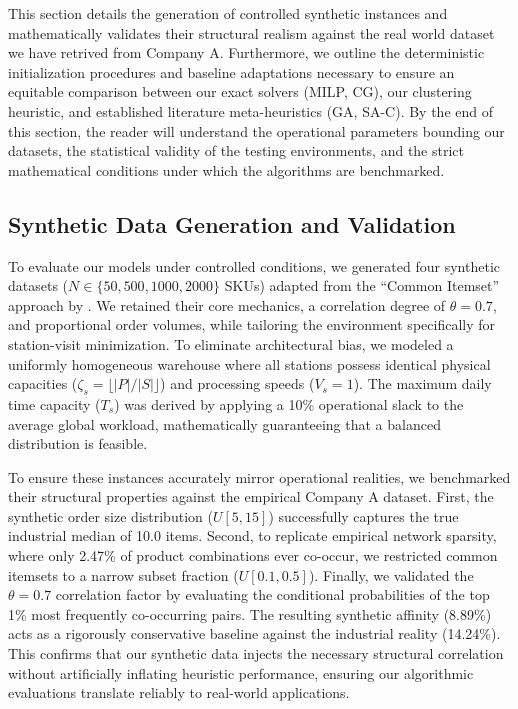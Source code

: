 \documentclass[preprint,review,11pt,authoryear]{elsarticle}
\begin{document}
This section details the generation of controlled synthetic instances and mathematically validates their structural realism against the real world dataset we have retrived from Company A. Furthermore, we outline the deterministic initialization procedures and baseline adaptations necessary to ensure an equitable comparison between our exact solvers (MILP, CG), our clustering heuristic, and established literature meta-heuristics (GA, SA-C). By the end of this section, the reader will understand the operational parameters bounding our datasets, the statistical validity of the testing environments, and the strict mathematical conditions under which the algorithms are benchmarked.

\subsection{Synthetic Data Generation and Validation}

To evaluate our models under controlled conditions, we generated four synthetic datasets ($N \in \{50, 500, 1000, 2000\}$ SKUs) adapted from the ``Common Itemset'' approach by \cite{zhang2019cie}. We retained their core mechanics, a correlation degree of $\theta = 0.7$,  and proportional order volumes, while tailoring the environment specifically for station-visit minimization. To eliminate architectural bias, we modeled a uniformly homogeneous warehouse where all stations possess identical physical capacities ($\zeta_s = \lfloor |P| / |S| \rfloor$) and processing speeds ($V_s = 1$). The maximum daily time capacity ($T_s$) was derived by applying a 10\% operational slack to the average global workload, mathematically guaranteeing that a balanced distribution is feasible.

To ensure these instances accurately mirror operational realities, we benchmarked their structural properties against the empirical Company A dataset. First, the synthetic order size distribution ($U[5, 15]$) successfully captures the true industrial median of 10.0 items. Second, to replicate empirical network sparsity, where only 2.47\% of product combinations ever co-occur, we restricted common itemsets to a narrow subset fraction ($U[0.1, 0.5]$). Finally, we validated the $\theta = 0.7$ correlation factor by evaluating the conditional probabilities of the top 1\% most frequently co-occurring pairs. The resulting synthetic affinity (8.89\%) acts as a rigorously conservative baseline against the industrial reality (14.24\%). This confirms that our synthetic data injects the necessary structural correlation without artificially inflating heuristic performance, ensuring our algorithmic evaluations translate reliably to real-world applications.
\end{document}
